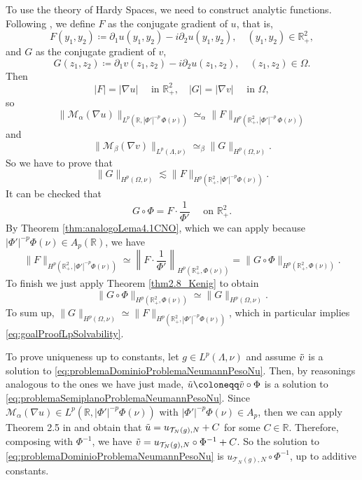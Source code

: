 \documentclass[12pt]{amsart}
\newcommand{\R}{\mathbb{R}}
\theoremstyle{plain}
\theoremstyle{definition}
\numberwithin{equation}{section}
\begin{document}
        To use the theory of Hardy Spaces, we need to construct analytic functions.
        Following \cite{CNO}, we define $F$ as the conjugate gradient of $u$, that is,
        \[
        F(y_1,y_2)
        \coloneqq
        \partial_1 u(y_1,y_2)-i\partial_2 u(y_1,y_2),\quad (y_1,y_2)\in\R_{+}^{2},
        \]
        and $G$ as the conjugate gradient of $v$, 
        \[
        G(z_1,z_2)
        \coloneqq
        \partial_1 v(z_1,z_2)-i\partial_2 u(z_1,z_2),\quad (z_1,z_2)\in\Omega.
        \]
        Then 
        \[
        |F|=|\nabla u|\quad \text{ in }\R_{+}^{2},\quad |G|=|\nabla v|\quad \text{ in }\Omega,
        \]
        so
        \[
        \|\mathcal{M}_{\alpha}(\nabla u)\|_{L^p(\R,|\Phi'|^{-p}\, \Phi(\nu))}
        \simeq_{\alpha}
        \|F\|_{H^p(\R_{+}^{2},|\Phi'|^{-p}\, \Phi(\nu))}
        \]
        and
        \[
        \|\mathcal{M}_{\beta}(\nabla v)\|_{L^p(\Lambda,\nu)}
        \simeq_{\beta}
        \|G\|_{H^p(\Omega,\nu)}.
        \]
        So we have to prove that
        \begin{equation}\label{eq:goalProofLpSolvability}
        \|G\|_{H^p(\Omega,\nu)}
        \lesssim 
        \|F\|_{H^p(\R_{+}^{2},|\Phi'|^{-p}\Phi(\nu))}.
        \end{equation}
        It can be checked that
        \[
        G\circ\Phi=F\cdot \frac{1}{\Phi'}
        \quad \text{ on }\R_{+}^{2}.
        \]
        By Theorem \ref{thm:analogoLema4.1CNO}, which we can apply because $|\Phi'|^{-p}\Phi(\nu)\in A_p(\R)$, we have
        \[
        \|F\|_{H^p(\R_{+}^{2},|\Phi'|^{-p}\Phi(\nu))}
        \simeq 
        \left\|F\cdot \frac{1}{\Phi'}\right\|_{H^p(\R_{+}^{2},\Phi(\nu))}
        =
        \|G\circ \Phi\|_{H^p(\R_{+}^{2},\Phi(\nu))}.
        \]
        To finish we just apply Theorem \ref{thm2.8_Kenig} to obtain 
        \[
        \|G\circ \Phi\|_{H^p(\R_{+}^{2},\Phi(\nu))}
        \simeq 
        \|G\|_{H^p(\Omega,\nu)}.
        \]
        To sum up, $\|G\|_{H^p(\Omega, \nu)}\simeq \|F\|_{H^p(\R_{+}^{2},|\Phi'|^{-p}\Phi(\nu))}$, which in particular implies \eqref{eq:goalProofLpSolvability}. 


        To prove uniqueness up to constants, let $g\in L^p(\Lambda,\nu)$ and assume $\Tilde{v}$ is a solution to \eqref{eq:problemaDominioProblemaNeumannPesoNu}. Then, by reasonings analogous to the ones we have just made, $\Tilde{u}\coloneqq \Tilde{v}\circ\Phi$ is a solution to \eqref{eq:problemaSemiplanoProblemaNeumannPesoNu}. Since $\mathcal{M}_{\alpha}(\nabla u)\in L^p(\R,|\Phi'|^{-p}\Phi(\nu))$ with $|\Phi'|^{-p}\Phi(\nu)\in A_p$, then we can apply Theorem 2.5 in \cite{transmissionCarro} and obtain that $\Tilde{u}=u_{\mathcal{T}_{N}(g),N}+C$ for some $C\in\R$. Therefore, composing with $\Phi^{-1}$, we have $\Tilde{v}=u_{\mathcal{T}_{N}(g),N}\circ\Phi^{-1}+C$. So the solution to \eqref{eq:problemaDominioProblemaNeumannPesoNu} is $u_{\mathcal{T}_{N}(g),N}\circ\Phi^{-1}$, up to additive constants.  
\end{document}
